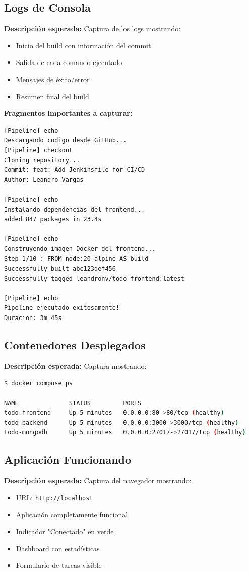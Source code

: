 \documentclass[12pt,a4paper]{article}
\begin{document}
\subsection{Logs de Consola}

\textbf{Descripción esperada:} Captura de los logs mostrando:
\begin{itemize}
    \item Inicio del build con información del commit
    \item Salida de cada comando ejecutado
    \item Mensajes de éxito/error
    \item Resumen final del build
\end{itemize}

\textbf{Fragmentos importantes a capturar:}
\begin{lstlisting}
[Pipeline] echo
Descargando codigo desde GitHub...
[Pipeline] checkout
Cloning repository...
Commit: feat: Add Jenkinsfile for CI/CD
Author: Leandro Vargas

[Pipeline] echo
Instalando dependencias del frontend...
added 847 packages in 23.4s

[Pipeline] echo
Construyendo imagen Docker del frontend...
Step 1/10 : FROM node:20-alpine AS build
Successfully built abc123def456
Successfully tagged leandronv/todo-frontend:latest

[Pipeline] echo
Pipeline ejecutado exitosamente!
Duracion: 3m 45s
\end{lstlisting}

\subsection{Contenedores Desplegados}

\textbf{Descripción esperada:} Captura mostrando:
\begin{lstlisting}[language=bash]
$ docker compose ps

NAME              STATUS         PORTS
todo-frontend     Up 5 minutes   0.0.0.0:80->80/tcp (healthy)
todo-backend      Up 5 minutes   0.0.0.0:3000->3000/tcp (healthy)
todo-mongodb      Up 5 minutes   0.0.0.0:27017->27017/tcp (healthy)
\end{lstlisting}

\subsection{Aplicación Funcionando}

\textbf{Descripción esperada:} Captura del navegador mostrando:
\begin{itemize}
    \item URL: \texttt{http://localhost}
    \item Aplicación completamente funcional
    \item Indicador "Conectado" en verde
    \item Dashboard con estadísticas
    \item Formulario de tareas visible
\end{itemize}
\end{document}
